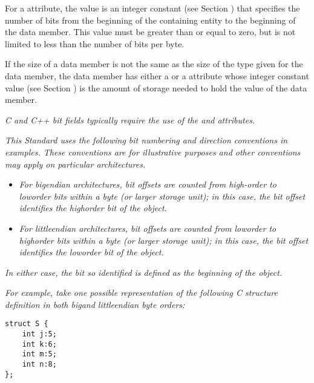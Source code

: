 For a  attribute, the value is an integer
constant 
(see Section ) 
that specifies the number of bits
from the beginning of the containing entity to the beginning
of the data member. This value must be greater than or equal
to zero, but is not limited to less than the number of bits
per byte.

If the size of a data member is not the same as the size
of the type given for the data member, the data member has
either a  or a  attribute whose
integer constant value 
(see Section ) 
is the amount
of storage needed to hold the value of the data member.

\textit{C and C++ bit fields typically require the use of the
 and  attributes.}

\textit{This Standard uses the following bit numbering and direction
conventions in examples. These conventions are for illustrative
purposes and other conventions may apply on particular
architectures.}


\begin{itemize}
\item \textit{For big\dash endian architectures, bit offsets are
counted from high-order to low\dash order bits within a byte (or
larger storage unit); in this case, the bit offset identifies
the high\dash order bit of the object.}

\item \textit{For little\dash endian architectures, bit offsets are
counted from low\dash order to high\dash order bits within a byte (or
larger storage unit); in this case, the bit offset identifies
the low\dash order bit of the object.}
\end{itemize}


\textit{In either case, the bit so identified is defined as the beginning of the object.}

\textit{For example, take one possible representation of the following C structure definition in both big\dash and little\dash endian byte orders:}

\begin{lstlisting}
struct S {
    int j:5;
    int k:6;
    int m:5;
    int n:8;
};
\end{lstlisting}

